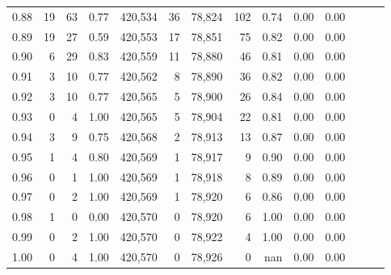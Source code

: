 \begin{tabular}{rrrrrrrrrrrrrr}
0.88 &      19 &     63 &  0.77 &  420,534 &       36 &  78,824 &     102 &  0.74 &  0.00 &      0.00 \\
0.89 &      19 &     27 &  0.59 &  420,553 &       17 &  78,851 &      75 &  0.82 &  0.00 &      0.00 \\
0.90 &       6 &     29 &  0.83 &  420,559 &       11 &  78,880 &      46 &  0.81 &  0.00 &      0.00 \\
0.91 &       3 &     10 &  0.77 &  420,562 &        8 &  78,890 &      36 &  0.82 &  0.00 &      0.00 \\
0.92 &       3 &     10 &  0.77 &  420,565 &        5 &  78,900 &      26 &  0.84 &  0.00 &      0.00 \\
0.93 &       0 &      4 &  1.00 &  420,565 &        5 &  78,904 &      22 &  0.81 &  0.00 &      0.00 \\
0.94 &       3 &      9 &  0.75 &  420,568 &        2 &  78,913 &      13 &  0.87 &  0.00 &      0.00 \\
0.95 &       1 &      4 &  0.80 &  420,569 &        1 &  78,917 &       9 &  0.90 &  0.00 &      0.00 \\
0.96 &       0 &      1 &  1.00 &  420,569 &        1 &  78,918 &       8 &  0.89 &  0.00 &      0.00 \\
0.97 &       0 &      2 &  1.00 &  420,569 &        1 &  78,920 &       6 &  0.86 &  0.00 &      0.00 \\
0.98 &       1 &      0 &  0.00 &  420,570 &        0 &  78,920 &       6 &  1.00 &  0.00 &      0.00 \\
0.99 &       0 &      2 &  1.00 &  420,570 &        0 &  78,922 &       4 &  1.00 &  0.00 &      0.00 \\
1.00 &       0 &      4 &  1.00 &  420,570 &        0 &  78,926 &       0 &   nan &  0.00 &      0.00 \\
\bottomrule
\end{tabular}
